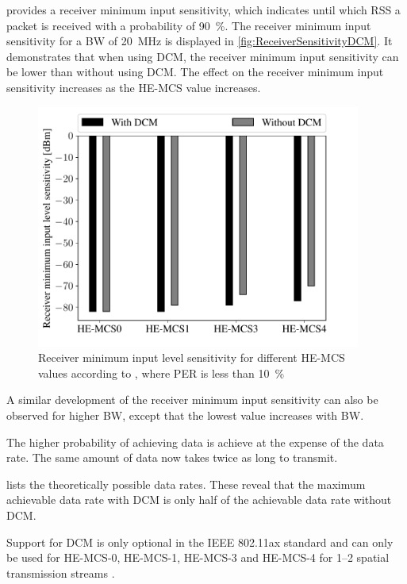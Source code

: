 \cite{standard_ieee_2021} provides a receiver minimum input sensitivity, which indicates until which RSS a packet is received with a probability of \SI{90}{\percent}. The receiver minimum input sensitivity for a \ac{BW} of \SI{20}{\mega\hertz} is displayed in \autoref{fig:ReceiverSensitivityDCM}. It demonstrates that when using \ac{DCM}, the receiver minimum input sensitivity can be lower than without using \ac{DCM}. The effect on the receiver minimum input sensitivity increases as the HE-MCS value increases.
\begin{figure}%
	\centering
	\includegraphics[width=0.95\textwidth]{figures/Receiver_minimum_DCM.pdf}
	\caption{Receiver minimum input level sensitivity for different HE-MCS values according to \cite{standard_ieee_2021}, where \ac{PER} is less than \SI{10}{\percent}}%
	\label{fig:ReceiverSensitivityDCM}%
\end{figure}

A similar development of the receiver minimum input sensitivity can also be observed for higher \ac{BW}, except that the lowest value increases with \ac{BW}.

The higher probability of achieving data is achieve at the expense of the data rate. The same amount of data now takes twice as long to transmit. 

\cite{standard_ieee_2021} lists the theoretically possible data rates. These reveal that the maximum achievable data rate with DCM is only half of the achievable data rate without DCM. 

Support for \ac{DCM} is only optional in the IEEE 802.11ax standard and can only be used for HE-\ac{MCS}-\num{0}, HE-\ac{MCS}-\num{1}, HE-\ac{MCS}-\num{3} and HE-\ac{MCS}-\num{4} for \numrange{1}{2} spatial transmission streams \cite{standard_ieee_2021}. 


